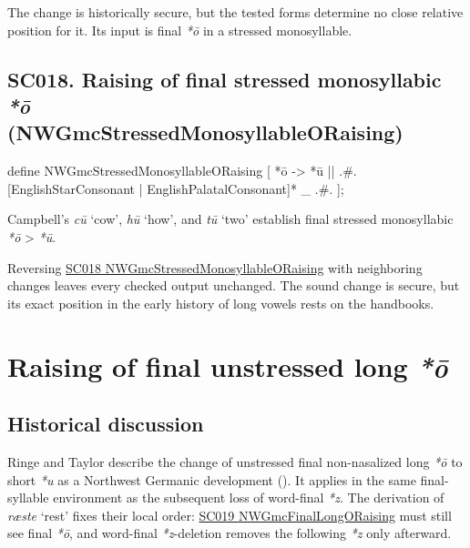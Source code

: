 \documentclass[
  british,
  a4paper,
  openany]{book}
\providecommand{\texorpdfstring}[2]{#1}
\DeclareRobustCommand{\CAPRRuleHeading}[2]{%
  #1\texorpdfstring{\\(#2)}{ (#2)}%
}
\begin{document}
The change is historically secure, but the tested forms determine no
close relative position for it. Its input is final \emph{*ō} in a
stressed monosyllable.

\subsection{\texorpdfstring{\CAPRRuleHeading{SC018. Raising of final stressed monosyllabic \emph{*ō}}{NWGmcStressedMonosyllableORaising}}{}}\label{rule-NWGmcStressedMonosyllableORaising}

\begin{ReaderFacingFoma}
define NWGmcStressedMonosyllableORaising [
    {*ō} -> {*ū} || .#. [EnglishStarConsonant | EnglishPalatalConsonant]* _ .#.
];
\end{ReaderFacingFoma}

Campbell's \emph{cū} `cow', \emph{hū} `how', and \emph{tū} `two'
establish final stressed monosyllabic \emph{*ō} \textgreater{}
\emph{*ū}.

Reversing \hyperref[rule-NWGmcStressedMonosyllableORaising]{SC018
NWGmcStressedMonosyllableORaising} with neighboring changes leaves every
checked output unchanged. The sound change is secure, but its exact
position in the early history of long vowels rests on the handbooks.

\newpage

\section{\texorpdfstring{Raising of final unstressed long
\emph{*ō}}{Raising of final unstressed long }}\label{raising-of-final-unstressed-long}

\subsection{Historical discussion}\label{historical-discussion-13}

Ringe and Taylor describe the change of unstressed final non-nasalized
long \emph{*ō} to short \emph{*u} as a Northwest Germanic development
(). It applies
in the same final-syllable environment as the subsequent loss of
word-final \emph{*z}. The derivation of \emph{ræste} `rest' fixes their
local order: \hyperref[rule-NWGmcFinalLongORaising]{SC019
NWGmcFinalLongORaising} must still see final \emph{*ō}, and word-final
\emph{*z}-deletion removes the following \emph{*z} only afterward.
\end{document}
